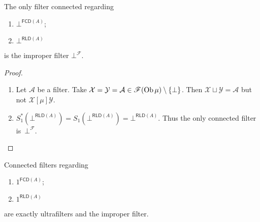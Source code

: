 \begin{prop}
  The only filter connected regarding
  \begin{enumerate}
    \item $\bot^{\mathsf{FCD} (A)}$;
    \item $\bot^{\mathsf{RLD} (A)}$
  \end{enumerate}
  is the improper filter $\bot^{\mathscr{F}}$.
\end{prop}

\begin{proof}

  \begin{enumerate}
    \item Let $\mathcal{A}$ be a filter. Take $\mathcal{X} = \mathcal{Y} =
    \mathcal{A} \in \mathscr{F} (\operatorname{Ob} \mu) \setminus \{ \bot \}$. Then
    $\mathcal{X} \sqcup \mathcal{Y} = \mathcal{A}$ but not $\mathcal{X}
    \mathrel{[\mu]} \mathcal{Y}$.

    \item $S^{\ast}_1 (\bot^{\mathsf{RLD} (A)}) = S_1
    (\bot^{\mathsf{RLD} (A)}) = \bot^{\mathsf{RLD} (A)}$. Thus
    the only connected filter is~$\bot^{\mathscr{F}}$.
  \end{enumerate}
\end{proof}

\begin{prop}
  Connected filters regarding
  \begin{enumerate}
    \item $1^{\mathsf{FCD} (A)}$;

    \item $1^{\mathsf{RLD} (A)}$
  \end{enumerate}
  are exactly ultrafilters and the improper filter.
\end{prop}

